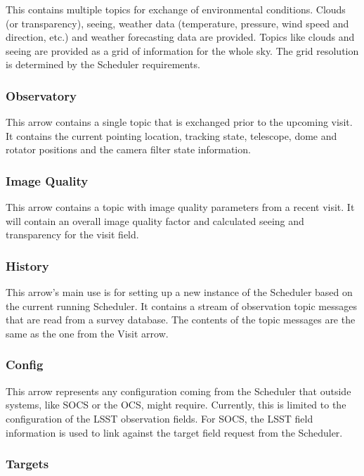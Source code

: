 \documentclass[]{spie}  %
\begin{document}
This contains multiple topics for exchange of environmental conditions. Clouds (or transparency), seeing, weather data (temperature, pressure, wind speed and direction, etc.) and weather forecasting data are provided. Topics like clouds and seeing are provided as a grid of information for the whole sky. The grid resolution is determined by the Scheduler requirements.

\subsubsection{Observatory}

This arrow contains a single topic that is exchanged prior to the upcoming visit. It contains the current pointing location, tracking state, telescope, dome and rotator positions and the camera filter state information.

\subsubsection{Image Quality}

This arrow contains a topic with image quality parameters from a recent visit. It will contain an overall image quality factor and calculated seeing and transparency for the visit field.

\subsubsection{History}

This arrow's main use is for setting up a new instance of the Scheduler based on the current running Scheduler. It contains a stream of observation topic messages that are read from a survey database. The contents of the topic messages are the same as the one from the Visit arrow.

\subsubsection{Config}

This arrow represents any configuration coming from the Scheduler that outside systems, like SOCS or the OCS, might require. Currently, this is limited to the configuration of the LSST observation fields. For SOCS, the LSST field information is used to link against the target field request from the Scheduler.

\subsubsection{Targets}
\end{document}
